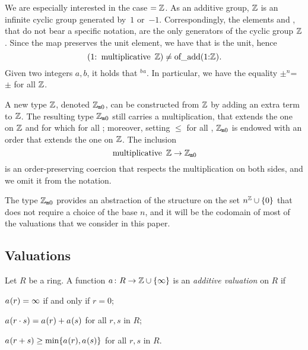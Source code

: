 \documentclass[sigplan,10pt, nonacm, review]{acmart}
\begin{document}
We are especially interested in the case  $= \mathbb{Z}$. As an additive group, $\mathbb{Z}$ is an infinite cyclic group generated by~$1$ or~$-1$. Correspondingly, the elements  and , that do not bear a specific notation, are the only generators of the cyclic group \;$\mathbb{Z}$. Since the map  preserves the unit element, we have that  is the unit, hence
\[
\text{\code{(1:}}\;\text{\code{multiplicative} }\ZZ)\neq\text{\code{of_add(1:}}\ZZ\text{\code{)}}.
\]
Given two integers $a, b$, it holds that $^b$$^a$. In particular, we have the equality $\pm$$^n$= $\pm$ for all  $\mathbb{Z}$\code{)}.

A new type  $\mathbb{Z}$\code{)}, denoted $\mathbb{Z}_{\mathtt{m}0}$, can be constructed from  $\mathbb{Z}$ by adding an extra term  to  $\mathbb{Z}$. The resulting type $\mathbb{Z}_{\mathtt{m}0}$ still carries a multiplication, that extends the one on  $\mathbb{Z}$ and for which  for all ; moreover, setting  $\le$  for all , $\mathbb{Z}_{\mathtt{m}0}$ is endowed with an order that extends the one on  $\mathbb{Z}$. The inclusion
\[
\text{\code{multiplicative} }\ZZ \rightarrow \wzmZZ
\]
is an order-preserving coercion that respects the multiplication on both sides, and we omit it from the notation.

The type $\mathbb{Z}_{\mathtt{m}0}$ provides an abstraction of the structure on the set $n^{\mathbb{Z}} \cup \{0\}$ that does not require a choice of the base $n$, and it will be the codomain of most of the valuations that we consider in this paper.

\subsection{Valuations}\label{subsection:valuations}
\begin{definition}\label{def:add_valuation}
Let $R$ be a ring. A function $\av \colon R \to \ZZ \cup \{\infty\}$ is an \emph{additive valuation} on $R$ if
\begin{listDef}
	\item $\av(r) = \infty$ if and only if $r = 0$; \label{def_add_valuation:zero}
	\item $\av (r\cdot s) = \av(r) + \av(s)$ for all $r, s$ in $R$;\label{def_add_valuation:mul}
	\item $\av (r + s) \geq \min \{\av(r), \av(s)\}$ for all $r, s$ in $R$. \label{def_add_valuation:add}
\end{listDef}
\end{definition}
\end{document}

